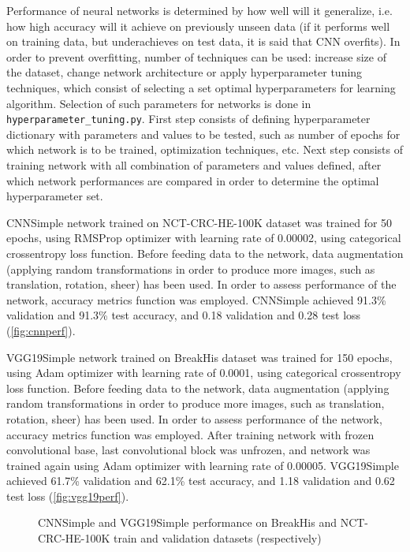 Performance of neural networks is determined by how well will it generalize, i.e. how high accuracy will it achieve on previously unseen data (if it performs well on training data, but underachieves on test data, it is said that CNN overfits). In order to prevent overfitting, number of techniques can be used: increase size of the dataset, change network architecture or apply hyperparameter tuning techniques, which consist of selecting a set optimal hyperparameters for learning algorithm. Selection of such parameters for networks is done in \texttt{hyperparameter\_tuning.py}. First step consists of defining hyperparameter dictionary with parameters and values to be tested, such as number of epochs for which network is to be trained, optimization techniques, etc. Next step consists of training network with all combination of parameters and values defined, after which network performances are compared in order to determine the optimal hyperparameter set.

CNNSimple network trained on NCT-CRC-HE-100K dataset was trained for 50 epochs, using RMSProp optimizer with learning rate of 0.00002, using categorical crossentropy loss function. Before feeding data to the network, data augmentation (applying random transformations in order to produce more images, such as translation, rotation, sheer) has been used. In order to assess performance of the network, accuracy metrics function was employed. CNNSimple achieved 91.3\% validation and 91.3\% test accuracy, and 0.18 validation and 0.28 test loss (\textcolor{red}{\autoref{fig:cnnperf}}).

VGG19Simple network trained on BreakHis dataset was trained for 150 epochs, using Adam optimizer with learning rate of 0.0001, using categorical crossentropy loss function. Before feeding data to the network, data augmentation (applying random transformations in order to produce more images, such as translation, rotation, sheer) has been used. In order to assess performance of the network, accuracy metrics function was employed. After training network with frozen convolutional base, last convolutional block was unfrozen, and network was trained again using Adam optimizer with learning rate of 0.00005. VGG19Simple achieved 61.7\% validation and 62.1\% test accuracy, and 1.18 validation and 0.62 test loss (\textcolor{red}{\autoref{fig:vgg19perf}}).

\begin{figure}[h]
	\centering
	\caption{CNNSimple and VGG19Simple performance on BreakHis and NCT-CRC-HE-100K train and validation datasets (respectively)}
	\label{fig:vgg19perf}
\end{figure}

